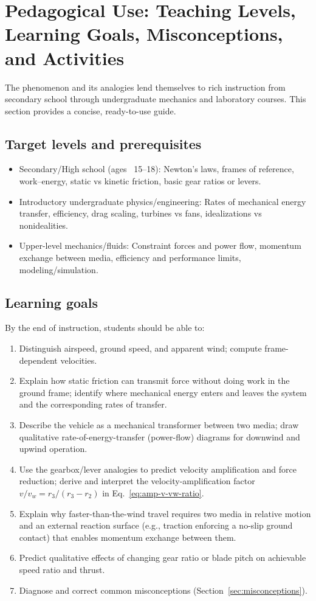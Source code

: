 \documentclass[reprint,aps,pra,longbibliography]{revtex4-2}
\begin{document}
\section{Pedagogical Use: Teaching Levels, Learning Goals, Misconceptions, and Activities}
\label{sec:pedagogy}

The phenomenon and its analogies lend themselves to rich instruction from secondary school through undergraduate mechanics and laboratory courses. This section provides a concise, ready-to-use guide.

\subsection{Target levels and prerequisites}

\begin{itemize}
\item Secondary/High school (ages ~15--18): Newton's laws, frames of reference, work--energy, static vs kinetic friction, basic gear ratios or levers.
\item Introductory undergraduate physics/engineering: Rates of mechanical energy transfer, efficiency, drag scaling, turbines vs fans, idealizations vs nonidealities.
\item Upper-level mechanics/fluids: Constraint forces and power flow, momentum exchange between media, efficiency and performance limits, modeling/simulation.
\end{itemize}

\subsection{Learning goals}

By the end of instruction, students should be able to:
\begin{enumerate}
\item Distinguish airspeed, ground speed, and apparent wind; compute frame-dependent velocities.
\item Explain how static friction can transmit force without doing work in the ground frame; identify where mechanical energy enters and leaves the system and the corresponding rates of transfer.
\item Describe the vehicle as a mechanical transformer between two media; draw qualitative rate-of-energy-transfer (power-flow) diagrams for downwind and upwind operation.
\item Use the gearbox/lever analogies to predict velocity amplification and force reduction; derive and interpret the velocity-amplification factor $v/v_w = r_3/(r_3-r_2)$ in Eq.~\eqref{eq:amp-v-vw-ratio}.
\item Explain why faster-than-the-wind travel requires two media in relative motion and an external reaction surface (e.g., traction enforcing a no-slip ground contact) that enables momentum exchange between them.
\item Predict qualitative effects of changing gear ratio or blade pitch on achievable speed ratio and thrust.
\item Diagnose and correct common misconceptions (Section~\ref{sec:misconceptions}).
\end{enumerate}
\end{document}
